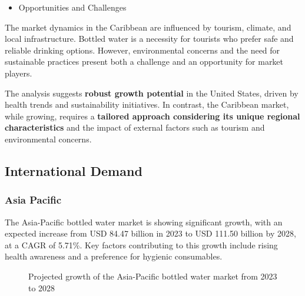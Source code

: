 \documentclass{article}
\begin{document}
\begin{itemize}
    \item Opportunities and Challenges
\end{itemize}
The market dynamics in the Caribbean are influenced by tourism, climate, and local infrastructure. Bottled water is a necessity for tourists who prefer safe and reliable drinking options. However, environmental concerns and the need for sustainable practices present both a challenge and an opportunity for market players.\par

The analysis suggests \textbf{robust growth potential} in the United States, driven by health trends and sustainability initiatives. In contrast, the Caribbean market, while growing, requires a \textbf{tailored approach considering its unique regional characteristics} and the impact of external factors such as tourism and environmental concerns.

\subsection{International Demand}

\subsubsection{Asia Pacific}

The Asia-Pacific bottled water market is showing significant growth, with an expected increase from USD 84.47 billion in 2023 to USD 111.50 billion by 2028, at a CAGR of 5.71\%. Key factors contributing to this growth include rising health awareness and a preference for hygienic consumables.

\begin{figure}[H]
\centering
{}
\caption{Projected growth of the Asia-Pacific bottled water market from 2023 to 2028}
\end{figure}
\end{document}
